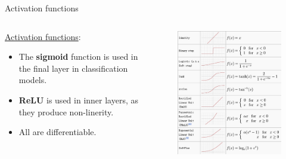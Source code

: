 \documentclass{beamer}
\begin{document}
\begin{frame}{Activation functions}
    \begin{columns}
        \begin{column}{0.4\linewidth}     
            \href{https://machinelearninggeek.com/activation-functions/}{Activation functions}:
            \begin{itemize}
                \item The {\bf sigmoid} function is used in the final layer in classification models.
                \item {\bf ReLU} is used in inner layers, as they produce non-linerity.
                \item All are differentiable. 
            \end{itemize}
        \end{column}
        \begin{column}{0.6\linewidth}
            \begin{figure}
                \includegraphics[width=0.8\linewidth]{activationfunctions}
            \end{figure}
        \end{column}
     \end{columns}
\end{frame}
\end{document}
